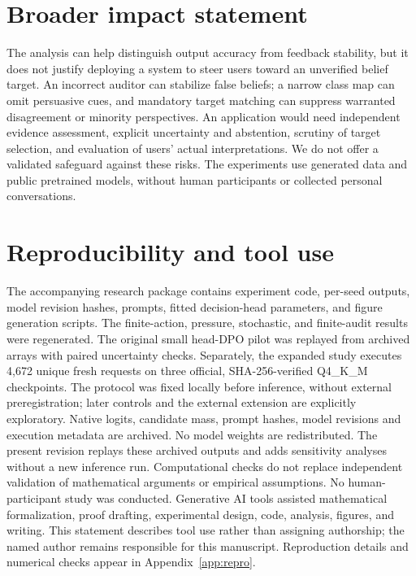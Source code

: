 \documentclass[10pt]{article}
\begin{document}
\section*{Broader impact statement}
The analysis can help distinguish output accuracy from feedback stability,
but it does not justify deploying a system to steer users toward an
unverified belief target. An incorrect auditor can stabilize false beliefs;
a narrow class map can omit persuasive cues, and mandatory target matching
can suppress warranted disagreement or minority perspectives. An application
would need independent evidence assessment, explicit uncertainty and
abstention, scrutiny of target selection, and evaluation of users' actual
interpretations. We do not offer a validated safeguard against these risks.
The experiments use generated data and public pretrained models, without
human participants or collected personal conversations.

\section*{Reproducibility and tool use}
The accompanying research package contains experiment code, per-seed outputs,
model revision hashes, prompts, fitted decision-head parameters, and figure
generation scripts. The finite-action, pressure, stochastic, and finite-audit results were regenerated. The original small head-DPO pilot was replayed from archived arrays with paired uncertainty checks. Separately, the expanded study executes 4,672 unique fresh requests on three official, SHA-256-verified Q4\_K\_M checkpoints. The protocol was fixed locally before inference, without external preregistration; later controls and the external extension are explicitly exploratory. Native logits, candidate mass, prompt hashes, model revisions and execution metadata are archived. No model weights are redistributed. The present revision replays these archived outputs and adds sensitivity analyses without a new inference run.
Computational checks do not replace independent validation of mathematical
arguments or empirical assumptions. No human-participant study was conducted.
Generative AI tools assisted mathematical formalization, proof drafting, experimental design, code, analysis, figures, and writing. This statement describes tool use rather than assigning authorship; the named author remains responsible for this manuscript. Reproduction details and numerical checks appear in Appendix~\ref{app:repro}.



\par\medskip
\appendix
\end{document}
